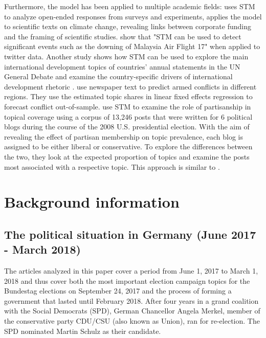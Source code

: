 \documentclass[12pt,a4paper,notitlepage]{article}
\begin{document}
Furthermore, the model has been applied to multiple academic fields: \citet{roberts_structural_2014} uses STM to analyze open-ended responses from surveys and experiments, \citet{farrell_corporate_2016} applies the model to scientific texts on climate change, revealing links between corporate funding and the framing of scientific studies. \citet{mishler_using_2015} show that "STM can be used to detect significant events such as the downing of Malaysia Air Flight 17" when applied to twitter data. Another study shows how STM can be used to explore the main international development topics of countries' annual statements in the UN General Debate and examine the country-specific drivers of international development rhetoric \citep{baturo_what_2017}. \citet{mueller_reading_2016} use newspaper text to predict armed conflicts in different regions. They use the estimated topic shares in linear fixed effects regression to forecast conflict out-of-sample. \citet{roberts_navigating_2016} use STM to examine the role of partisanship in topical coverage using a corpus of 13,246 posts that were written for 6 political blogs during the course of the 2008 U.S. presidential election. With the aim of revealing the effect of partisan membership on topic prevalence, each blog is assigned to be either liberal or conservative. To explore the differences between the two, they look at the expected proportion of topics and examine the posts most associated with a respective topic. This approach is similar to \citet{roberts_model_2016}. 


\section{Background information}\label{ch_elections}

\subsection{The political situation in Germany (June 2017 - March 2018)}

The articles analyzed in this paper cover a period from June 1, 2017 to March 1, 2018 and thus cover both the most important election campaign topics for the Bundestag elections on September 24, 2017 and the process of forming a government that lasted until February 2018. After four years in a grand coalition with the Social Democrats (SPD), German Chancellor Angela Merkel, member of the conservative party CDU/CSU (also known as Union), ran for re-election. The SPD nominated Martin Schulz as their candidate. 
\end{document}
